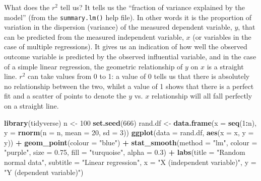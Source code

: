 \documentclass[english,10pt,a4paper,oneside]{book}
\newenvironment{Shaded}{\begin{snugshade}}{\end{snugshade}}
\newcommand{\KeywordTok}[1]{\textcolor[rgb]{0.13,0.29,0.53}{\textbf{#1}}}
\newcommand{\DataTypeTok}[1]{\textcolor[rgb]{0.13,0.29,0.53}{#1}}
\newcommand{\DecValTok}[1]{\textcolor[rgb]{0.00,0.00,0.81}{#1}}
\newcommand{\FloatTok}[1]{\textcolor[rgb]{0.00,0.00,0.81}{#1}}
\newcommand{\StringTok}[1]{\textcolor[rgb]{0.31,0.60,0.02}{#1}}
\newcommand{\OperatorTok}[1]{\textcolor[rgb]{0.81,0.36,0.00}{\textbf{#1}}}
\newcommand{\NormalTok}[1]{#1}
\theoremstyle{definition}
\theoremstyle{definition}
\theoremstyle{definition}
\theoremstyle{remark}
\begin{document}
What does the \(r^{2}\) tell us? It tells us the \enquote{fraction of
variance explained by the model} (from the \texttt{summary.lm()} help
file). In other words it is the proportion of variation in the
dispersion (variance) of the measured dependent variable, \(y\), that
can be predicted from the measured independent variable, \(x\) (or
variables in the case of multiple regressions). It gives us an
indication of how well the observed outcome variable is predicted by the
observed influential variable, and in the case of a simple linear
regression, the geometric relationship of \(y\) on \(x\) is a straight
line. \(r^{2}\) can take values from 0 to 1: a value of 0 tells us that
there is absolutely no relationship between the two, whilst a value of 1
shows that there is a perfect fit and a scatter of points to denote the
\(y\) vs. \(x\) relationship will all fall perfectly on a straight line.

\begin{Shaded}
\begin{Highlighting}[]
\KeywordTok{library}\NormalTok{(tidyverse)}
\NormalTok{n <-}\StringTok{ }\DecValTok{100}
\KeywordTok{set.seed}\NormalTok{(}\DecValTok{666}\NormalTok{)}
\NormalTok{rand.df <-}\StringTok{ }\KeywordTok{data.frame}\NormalTok{(}\DataTypeTok{x =} \KeywordTok{seq}\NormalTok{(}\DecValTok{1}\OperatorTok{:}\NormalTok{n),}
                      \DataTypeTok{y =} \KeywordTok{rnorm}\NormalTok{(}\DataTypeTok{n =}\NormalTok{ n, }\DataTypeTok{mean =} \DecValTok{20}\NormalTok{, }\DataTypeTok{sd =} \DecValTok{3}\NormalTok{))}
\KeywordTok{ggplot}\NormalTok{(}\DataTypeTok{data =}\NormalTok{ rand.df, }\KeywordTok{aes}\NormalTok{(}\DataTypeTok{x =}\NormalTok{ x, }\DataTypeTok{y =}\NormalTok{ y)) }\OperatorTok{+}
\StringTok{  }\KeywordTok{geom_point}\NormalTok{(}\DataTypeTok{colour =} \StringTok{"blue"}\NormalTok{) }\OperatorTok{+}
\StringTok{  }\KeywordTok{stat_smooth}\NormalTok{(}\DataTypeTok{method =} \StringTok{"lm"}\NormalTok{, }\DataTypeTok{colour =} \StringTok{"purple"}\NormalTok{, }\DataTypeTok{size =} \FloatTok{0.75}\NormalTok{, }\DataTypeTok{fill =} \StringTok{"turquoise"}\NormalTok{, }\DataTypeTok{alpha =} \FloatTok{0.3}\NormalTok{) }\OperatorTok{+}
\StringTok{  }\KeywordTok{labs}\NormalTok{(}\DataTypeTok{title =} \StringTok{"Random normal data"}\NormalTok{,}
       \DataTypeTok{subtitle =} \StringTok{"Linear regression"}\NormalTok{,}
       \DataTypeTok{x =} \StringTok{"X (independent variable)"}\NormalTok{,}
       \DataTypeTok{y =} \StringTok{"Y (dependent variable)"}\NormalTok{)}
\end{Highlighting}
\end{Shaded}
\end{document}
